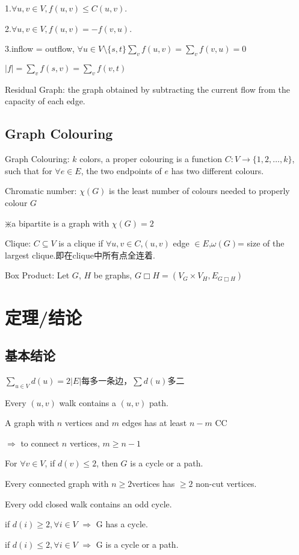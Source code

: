 \documentclass[12pt,a4paper]{ctexrep}
\begin{document}
1.$\forall u,v \in V, f(u,v)\leq C(u,v)$. 

2.$\forall u,v \in V, f(u,v) = -f(v,u)$. 

3.inflow = outflow, $\forall u \in V\setminus \{s,t\} \sum_{v} f(u,v) = \sum_{v} f(v,u) = 0$

$|f| = \sum_{v} f(s,v) = \sum_{v} f(v,t)$

Residual Graph: the graph obtained by subtracting the current flow from the capacity of each edge.
\subsection{Graph Colouring}
Graph Colouring: $k$ colors, a proper colouring is a function $C: V\rightarrow \{1,2,\dots,k\}$, such that for $\forall e \in E$, the two endpoints of $e$ has two different colours.

Chromatic number: $\chi(G)$ is the least number of colours needed to properly colour $G$

$\divideontimes$a bipartite is a graph with $\chi(G)=2$

Clique: $C\subseteq V$ is a clique if $\forall u,v \in C$,$(u,v)$ edge $\in E$,$\omega(G)$= size of the largest clique.即在clique中所有点全连着.

Box Product: Let $G$, $H$ be graphs, $G\Box H =(V_{G} \times V_{H},E_{G \Box H})$
\section{定理/结论}
\subsection{基本结论}
$\sum_{u \in V} d(u) = 2|E|$每多一条边，$\sum d(u)$多二

Every $(u,v)$ walk contains a $(u,v)$ path.

A graph with $n$ vertices and $m$ edges has at least $n-m$ CC

$\Rightarrow$ to connect $n$ vertices, $m \geq n-1$

For $\forall v \in V$, if $d(v)\leq 2$, then $G$ is a cycle or a path.

Every connected graph with $n \geq 2$vertices has $\geq 2$ non-cut vertices.

Every odd closed walk contains an odd cycle.

if $d(i) \geq 2, \forall i \in V$ $\Rightarrow$ G has a cycle.

if $d(i) \leq 2, \forall i \in V$ $\Rightarrow$ G is a cycle or a path.
\end{document}
